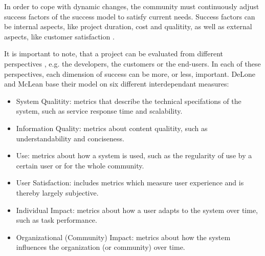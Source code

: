 In order to cope with dynamic changes, the community must continuously adjust success factors of the success model to satisfy current needs. Success factors can be internal aspects, like project duration, cost and qualitity, as well as external aspects, like customer satisfaction \cite{AgRa06}.

It is important to note, that a project can be evaluated from different perspectives \cite{RKJa15}, e.g. the developers, the customers or the end-users.
In each of these perspectives, each dimension of success can be more, or less, important.
DeLone and McLean \cite{DeMc92} base their model on six different interdependant measures:
\begin{itemize}
    \item System Qualitity: metrics that describe the technical specifations of the system, such as service response time and scalability.
    \item Information Quality: metrics about content qualitity, such as understandability and conciseness.
    \item Use: metrics about how a system is used, such as the regularity of use by a certain user or for the whole community.
    \item User Satisfaction: includes metrics which measure user experience and is thereby largely subjective.
    \item Individual Impact: metrics about how a user adapts to the system over time, such as task performance.
    \item Organizational (Community) Impact: metrics about how the system influences the organization (or community) over time.
\end{itemize}

